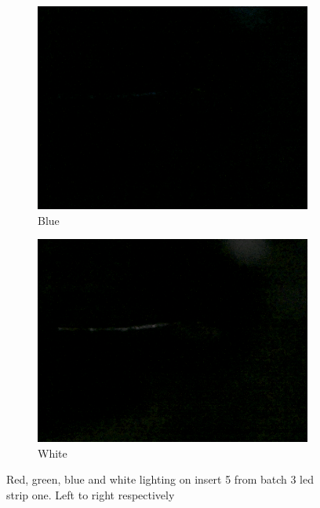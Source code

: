 \begin{figure}
	\hspace*{\fill}
	\begin{subfigure}{0.24\textwidth}
		\includegraphics[width=\linewidth, keepaspectratio=true]{./fig/Vision/Dataset/automated_datasets/2_created_datasets/1_Birthday_dataset/b_003_p_005_b_l_006_blue_A.png}
		\caption{Blue}
	\end{subfigure}
	\hspace*{\fill}
	\begin{subfigure}{0.24\textwidth}
		\includegraphics[width=\linewidth, keepaspectratio=true]{./fig/Vision/Dataset/automated_datasets/2_created_datasets/1_Birthday_dataset/b_003_p_005_b_l_006_white_A.png}
		\caption{White}
	\end{subfigure}
\caption{Red, green, blue and white lighting on insert 5 from batch 3 led strip one. Left to right respectively}
\end{figure}

